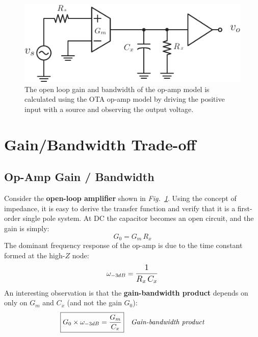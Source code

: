 \newpage
\begin{figure}[t]
\centering
\includegraphics[scale=1.15]{ota_amp_open}
\caption{The open loop gain and bandwidth of the op-amp model is calculated using the OTA op-amp model by driving the positive input with a source and observing the output voltage.}
\label{fig:ota_amp_open}
\end{figure}
\section{Gain/Bandwidth Trade-off}
\subsection{Op-Amp Gain / Bandwidth}
Consider the \textbf{open-loop amplifier} shown in \emph{Fig.~\ref{fig:ota_amp_open}}.  Using the concept of impedance, it is easy to derive the transfer function and verify that it is a first-order single pole system.  At DC the capacitor becomes an open circuit, and the gain is simply:
    \begin{equation}
        G_0 = G_m\,R_x
    \end{equation}
The dominant frequency response of the op-amp is due to the time constant formed at the high-$Z$ node:
    \begin{equation}
        \omega_{-3dB} = \mathlarger{\frac{1}{R_x\,C_x}}
    \end{equation}
An interesting observation is that the \textbf{gain-bandwidth product} depends on only on $G_m$ and $C_x$ (and not the gain $G_0$): 
    \begin{align}
        \Aboxed{G_0 \times \omega_{-3dB} &= \frac{G_m}{C_x}}
        &\textit{Gain-bandwidth product}
        \label{eq:gain_bw_prod}
    \end{align}
